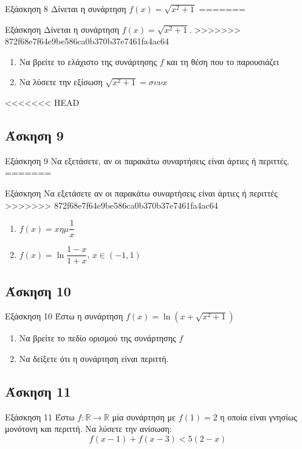 \documentclass{presentation}
\begin{document}
\begin{frame}[label=Άσκηση8,t]{Εξάσκηση 8}
      Δίνεται η συνάρτηση $f(x)=\sqrt{x^2+1}$
=======
\begin{frame}{Εξάσκηση}
      Δίνεται η συνάρτηση $f(x)=\sqrt{x^2+1}$.
>>>>>>> 872f68e7f64e9be586ca0b370b37e7461fa4ac64
      \begin{enumerate}
            \item Να βρείτε το ελάχιστο της συνάρτησης $f$ και τη θέση που το παρουσιάζει \pause
            \item Να λύσετε την εξίσωση $\sqrt{x^2+1}=συνx$
      \end{enumerate}
\end{frame}

<<<<<<< HEAD
\subsection{Άσκηση 9}
\begin{frame}[label=Άσκηση9,t]{Εξάσκηση 9}
      Να εξετάσετε, αν οι παρακάτω συναρτήσεις είναι άρτιες ή περιττές.
=======
\begin{frame}{Εξάσκηση}
      Να εξετάσετε αν οι παρακάτω συναρτήσεις είναι άρτιες ή περιττές
>>>>>>> 872f68e7f64e9be586ca0b370b37e7461fa4ac64
      \begin{enumerate}
            \item $f(x)=xημ\dfrac{1}{x}$ \pause
            \item $f(x)=\ln \dfrac{1-x}{1+x}$, $x\in (-1,1)$
      \end{enumerate}
\end{frame}

\subsection{Άσκηση 10}
\begin{frame}[label=Άσκηση10,t]{Εξάσκηση 10}
      Έστω η συνάρτηση $f(x)=\ln (x+\sqrt{x^2+1})$
      \begin{enumerate}
            \item Να βρείτε το πεδίο ορισμού της συνάρτησης $f$ \pause
            \item Να δείξετε ότι η συνάρτηση είναι περιττή.
      \end{enumerate}
\end{frame}

\subsection{Άσκηση 11}
\begin{frame}[label=Άσκηση11,t]{Εξάσκηση 11}
      Έστω $f:\mathbb{R}\to\mathbb{R}$ μία συνάρτηση με $f(1)=2$ η οποία είναι γνησίως μονότονη και περιττή. Να λύσετε την ανίσωση:
      $$f(x-1)+f(x-3)<5(2-x)$$
\end{frame}


\end{frame}
\end{frame}
\end{document}
